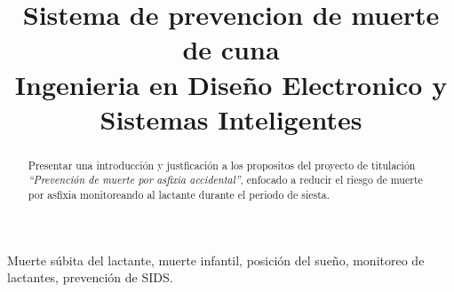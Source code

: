 \title{
    Sistema de prevencion de muerte de cuna\\
    \small{Ingenieria en Diseño Electronico y Sistemas Inteligentes}
}
\author{
    \and
    \and
}
\maketitle

%
%
\begin{abstract}
    Presentar una introducción y justficación a los propositos del proyecto de titulación \emph{``Prevención de muerte por asfixia accidental''}, enfocado a reducir el riesgo de muerte por asfixia monitoreando al lactante durante el periodo de siesta.
\end{abstract}
\begin{IEEEkeywords}
    Muerte súbita del lactante, muerte infantil, posición del sueño, monitoreo de lactantes, prevención de SIDS.
\end{IEEEkeywords}

\tableofcontents
